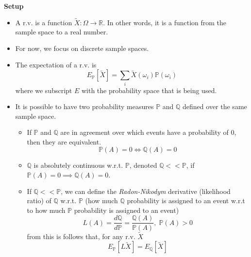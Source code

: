 \documentclass[11pt]{article}
\begin{document}
\textbf{Setup}
\begin{itemize}
    \item A r.v. is a function $\tilde{X}: \Omega \rightarrow \mathbb{R}$. In other words, it 
    is a function from the sample space to a real number. 
    \item For now, we focus on discrete sample spaces.
    \item The expectation of a r.v. is 
    \[E_{\mathbb{P}}[\tilde{X}] = \sum_{i} \tilde{X}(\omega_i)\mathbb{P}(\omega_i)\]
    where we subscript $E$ with the probability space that is being used.
    \item It is possible to have two probability measures $\mathbb{P}$ and $\mathbb{Q}$ defined 
    over the same sample space. 
    \begin{itemize}
        \item If $\mathbb{P}$ and $\mathbb{Q}$ are in agreement over which events have a 
        probability of 0, then they are equivalent. 
        \[\mathbb{P}(A) = 0 \iff \mathbb{Q}(A) = 0\]
        \item $\mathbb{Q}$ is absolutely continuous w.r.t. $\mathbb{P}$, denoted $\mathbb{Q} << 
        \mathbb{P}$, if $\mathbb{P}(A) = 0 \implies \mathbb{Q}(A) = 0$.
        \item If $\mathbb{Q} << \mathbb{P}$, we can define the \textit{Radon-Nikodym} 
        derivative (likelihood ratio) of $\mathbb{Q}$ w.r.t. $\mathbb{P}$ (how much 
        $\mathbb{Q}$ probability is assigned to an event w.r.t to how much $\mathbb{P}$ 
        probability is assigned to an event)
        \[L(A) = \frac{d\mathbb{Q}}{d\mathbb{P}} = \frac{\mathbb{Q}(A)}{\mathbb{P}(A)}, \; 
        \mathbb{P}(A) > 0\]
        from this is follows that, for any r.v. $\tilde{X}$
        \[E_{\mathbb{P}}[L\tilde{X}] = E_{\mathbb{Q}}[\tilde{X}]\]
    \end{itemize}
\end{itemize}
\end{document}
